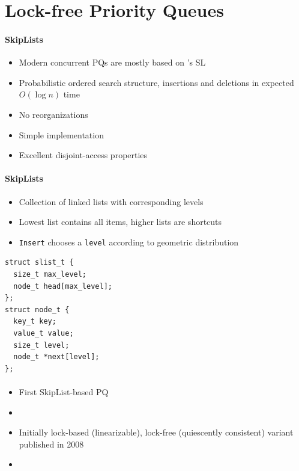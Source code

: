 \documentclass[usenames,dvipsnames]{beamer}
\begin{document}
\section{Lock-free Priority Queues} \label{sec:lockfree}

\begin{frame}{}
\framesubtitle{SkipLists}

\begin{itemize}
\item Modern concurrent \acp{PQ} are mostly based on \citeauthor{pugh1990skip}'s \ac{SL}
\item Probabilistic ordered search structure, insertions and deletions in expected $O(\log n)$ time
\item No reorganizations
\item Simple implementation
\item Excellent disjoint-access properties
\end{itemize}
\end{frame}

\begin{frame}[fragile]{}
\framesubtitle{SkipLists}

\begin{itemize}
\item Collection of linked lists with corresponding levels
\item Lowest list contains all items, higher lists are shortcuts
\item \lstinline|Insert| chooses a \lstinline|level| according to geometric distribution
\end{itemize}

\begin{lstlisting}
struct slist_t {
  size_t max_level;
  node_t head[max_level];
};
struct node_t {
  key_t key;
  value_t value;
  size_t level;
  node_t *next[level];
};
\end{lstlisting}
\end{frame}


\begin{frame}{}
\framesubtitle{\citeauthor{shavit2000skiplist}}

\begin{itemize}
\item First SkipList-based \ac{PQ}
\item {}
\item Initially lock-based (linearizable), lock-free (quiescently consistent)
      variant published in 2008
\item {}
\end{itemize}
\end{frame}
\end{document}
